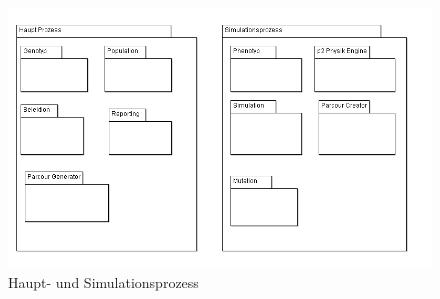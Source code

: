     \begin{figure}[H]
      \includegraphics[scale=0.45,center]{graphics/haupt_simulations_prozess}
      \caption{Haupt- und Simulationsprozess\label{fig:hauptSimuProzesse}}
    \end{figure}
